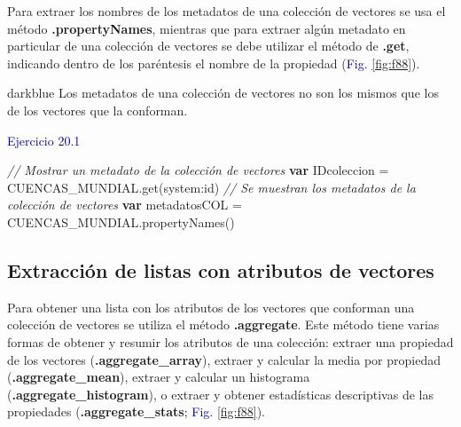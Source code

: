\documentclass[
  12pt,
  letterpaper,
  twoside]{book}
\newenvironment{Shaded}{\begin{snugshade}}{\end{snugshade}}
\newcommand{\CommentTok}[1]{\textcolor[rgb]{0.24,0.58,0.00}{\textit{#1}}}
\newcommand{\FunctionTok}[1]{\textcolor[rgb]{0.48,0.12,0.64}{#1}}
\newcommand{\KeywordTok}[1]{\textcolor[rgb]{0.00,0.00,0.00}{\textbf{#1}}}
\newcommand{\NormalTok}[1]{#1}
\newcommand{\OperatorTok}[1]{\textcolor[rgb]{0.00,0.00,0.00}{#1}}
\newcommand{\StringTok}[1]{\textcolor[rgb]{0.87,0.29,0.22}{#1}}
\newcommand\boldpurple[1]{\textcolor{darkpurple}{\textbf{#1}}}
\begin{document}
Para extraer los nombres de los metadatos de una colección de vectores se usa el método \boldpurple{.propertyNames}, mientras que para extraer algún metadato en particular de una colección de vectores se debe utilizar el método de \boldpurple{.get}, indicando dentro de los paréntesis el nombre de la propiedad (\textcolor{darkblue}{Fig.} \ref{fig:f88}).

\begin{bluebox2}

\begin{awesomeblock}{5pt}{\faLightbulb}{darkblue}
Los metadatos de una colección de vectores no son los mismos que los de los vectores que la conforman.

\end{awesomeblock}

\end{bluebox2}

\textcolor{darkblue}{Ejercicio 20.1}

\begin{Shaded}
\begin{Highlighting}[]
\CommentTok{// Mostrar un metadato de la colección de vectores}
\KeywordTok{var}\NormalTok{ IDcoleccion }\OperatorTok{=}\NormalTok{ CUENCAS\_MUNDIAL}\OperatorTok{.}\FunctionTok{get}\NormalTok{(}\StringTok{\textquotesingle{}system:id\textquotesingle{}}\NormalTok{) }
\CommentTok{// Se muestran los metadatos de la colección de vectores}
\KeywordTok{var}\NormalTok{ metadatosCOL }\OperatorTok{=}\NormalTok{ CUENCAS\_MUNDIAL}\OperatorTok{.}\FunctionTok{propertyNames}\NormalTok{()}
\end{Highlighting}
\end{Shaded}

\hypertarget{extracciuxf3n-de-listas-con-atributos-de-vectores}{%
\subsection*{Extracción de listas con atributos de vectores}\label{extracciuxf3n-de-listas-con-atributos-de-vectores}}

Para obtener una lista con los atributos de los vectores que conforman una colección de vectores se utiliza el método \boldpurple{.aggregate}. Este método tiene varias formas de obtener y resumir los atributos de una colección: extraer una propiedad de los vectores (\boldpurple{.aggregate\_array}), extraer y calcular la media por propiedad (\boldpurple{.aggregate\_mean}), extraer y calcular un histograma (\boldpurple{.aggregate\_histogram}), o extraer y obtener estadísticas descriptivas de las propiedades (\boldpurple{.aggregate\_stats}; \textcolor{darkblue}{Fig.} \ref{fig:f88}).
\end{document}
